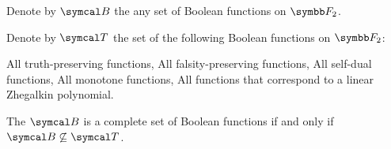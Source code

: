 \begin{theorem}\label{thm:posts_completeness_theorem}\cite{Pelletier1990}
  Denote by \( \Cal{B} \) the any set of Boolean functions on \( \BF_2 \).

  Denote by \( \Cal{T} \) the set of the following Boolean functions on \( \BF_2 \):
  \begin{thmenum}
     All truth-preserving functions,
     All falsity-preserving functions,
     All self-dual functions,
     All monotone functions,
     All functions that correspond to a linear Zhegalkin polynomial.
  \end{thmenum}

  The \( \Cal{B} \) is a complete set of Boolean functions if and only if \( \Cal{B} \not\subseteq \Cal{T} \).
\end{theorem}

